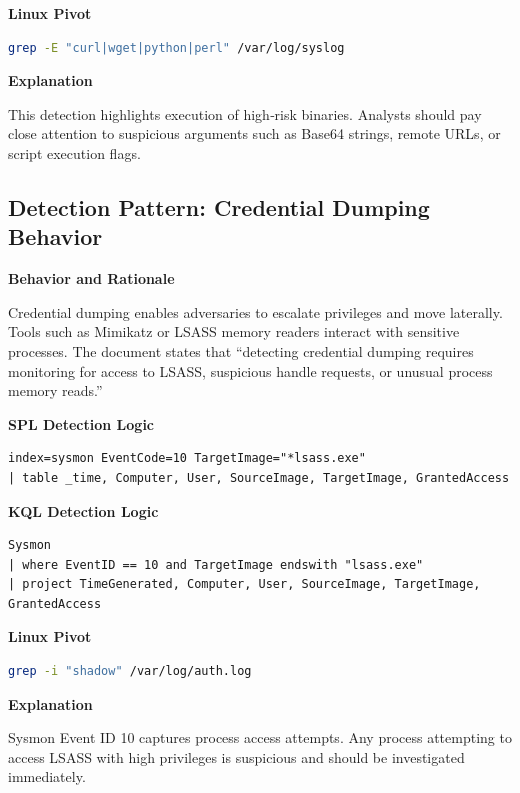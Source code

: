 \textbf{Linux Pivot}

\begin{lstlisting}[language=bash]
grep -E "curl|wget|python|perl" /var/log/syslog
\end{lstlisting}

\textbf{Explanation}

This detection highlights execution of high‑risk binaries. Analysts should pay close attention to suspicious arguments such as 
Base64 strings, remote URLs, or script execution flags.


\subsection*{Detection Pattern: Credential Dumping Behavior}

\textbf{Behavior and Rationale}

Credential dumping enables adversaries to escalate privileges and move laterally. Tools such as Mimikatz or LSASS memory readers 
interact with sensitive processes. The document states that “detecting credential dumping requires monitoring for access to LSASS, 
suspicious handle requests, or unusual process memory reads.”

\textbf{SPL Detection Logic}

\begin{lstlisting}
index=sysmon EventCode=10 TargetImage="*lsass.exe"
| table _time, Computer, User, SourceImage, TargetImage, GrantedAccess
\end{lstlisting}

\textbf{KQL Detection Logic}

\begin{lstlisting}
Sysmon
| where EventID == 10 and TargetImage endswith "lsass.exe"
| project TimeGenerated, Computer, User, SourceImage, TargetImage, GrantedAccess
\end{lstlisting}

\textbf{Linux Pivot}

\begin{lstlisting}[language=bash]
grep -i "shadow" /var/log/auth.log
\end{lstlisting}

\textbf{Explanation}

Sysmon Event ID 10 captures process access attempts. Any process attempting to access LSASS with high privileges is suspicious 
and should be investigated immediately.

